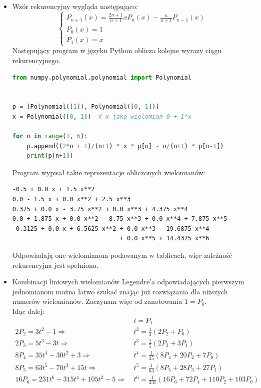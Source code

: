 \documentclass{article}
\begin{document}
\begin{itemize}
    \item Wzór rekurencyjny wygląda następująco:
    \[\left\{
    \begin{array}{l}
         P_{n+1}(x) = \frac{2n+1}{n+1}xP_n(x) - \frac{n}{n+1}P_{n-1}(x)\\
         P_0(x) = 1\\
         P_1(x) = x
    \end{array}
    \right.\]
    Następujący program w języku Python oblicza kolejne wyrazy ciągu rekurencyjnego.
\begin{lstlisting}[language=Python]
from numpy.polynomial.polynomial import Polynomial


p = [Polynomial([1]), Polynomial([0, 1])]
x = Polynomial([0, 1])  # x jako wielomian 0 + 1*x

for n in range(1, 6):
    p.append((2*n + 1)/(n+1) * x * p[n] - n/(n+1) * p[n-1])
    print(p[n+1])
\end{lstlisting}
    Program wypisał takie reprezentacje obliczonych wielomianów:
\begin{verbatim}
-0.5 + 0.0 x + 1.5 x**2
0.0 - 1.5 x + 0.0 x**2 + 2.5 x**3
0.375 + 0.0 x - 3.75 x**2 + 0.0 x**3 + 4.375 x**4
0.0 + 1.875 x + 0.0 x**2 - 8.75 x**3 + 0.0 x**4 + 7.875 x**5
-0.3125 + 0.0 x + 6.5625 x**2 + 0.0 x**3 - 19.6875 x**4
                              + 0.0 x**5 + 14.4375 x**6
\end{verbatim}
    Odpowiadają one wielomianom podawanym w tablicach, więc zależność rekurencyjna jest spełniona.

    \item Kombinacji liniowych wielomianów Legendre'a odpowiadających pierwszym jednomianom można łatwo szukać znając już rozwiązania dla niższych numerów wielomianów. Zaczynam więc od zanotowania \(1 = P_0\).\\
    Idąc dalej:
    \begin{align*}
        &t = P_1\\
        2P_2 = 3t^2 - 1 \Rightarrow\ &t^2 = \frac{1}{3}(2P_2 + P_0)\\
        2P_3 = 5t^3 - 3t \Rightarrow\ &t^3 = \frac{1}{5}(2P_3 + 3P_1)\\
        8P_4 = 35t^4 - 30t^2 + 3 \Rightarrow\ &t^4 = \frac{1}{35}(8P_4 + 20P_2 + 7P_0)\\
        8P_5 = 63t^5 - 70t^3 + 15t \Rightarrow\ &t^5 = \frac{1}{63}(8P_5 + 28P_3 + 27P_1)\\
        16P_6 = 231t^6 - 315t^4 + 105t^2 - 5 \Rightarrow\ &t^6 = \frac{1}{231}(16P_6 + 72P_4 + 110P_2 + 103P_0)
    \end{align*}
\end{itemize}
\end{document}
